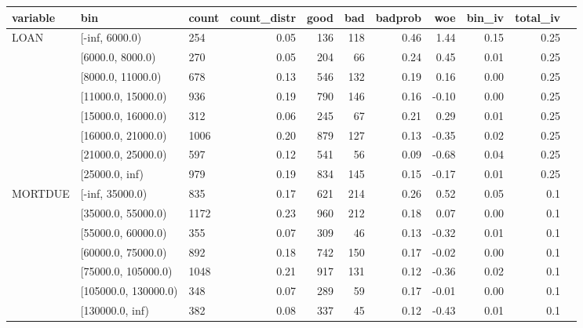 \begin{landscape}
	\begin{figure}[!ht]
		\centering
		\begin{tabular}{lllrrrrrrrr}
			\toprule
			variable & bin &  count &  count\_distr &  good &  bad &   badprob &       woe &    bin\_iv &  total\_iv \\
			\midrule
			    LOAN &      [-inf, 6000.0) &    254 &         0.05 &   136 &  118 &     0.46 &  1.44 &    0.15 &      0.25 \\
			     &    [6000.0, 8000.0) &    270 &         0.05 &   204 &   66 &     0.24 &  0.45 &    0.01 &      0.25 \\
			     &   [8000.0, 11000.0) &    678 &         0.13 &   546 &  132 &     0.19 &  0.16 &    0.00 &      0.25 \\
			     &  [11000.0, 15000.0) &    936 &         0.19 &   790 &  146 &     0.16 & -0.10 &    0.00 &      0.25 \\
			     &  [15000.0, 16000.0) &    312 &         0.06 &   245 &   67 &     0.21 &  0.29 &    0.01 &      0.25 \\
			     &  [16000.0, 21000.0) &   1006 &         0.20 &   879 &  127 &     0.13 & -0.35 &    0.02 &      0.25 \\
			     &  [21000.0, 25000.0) &    597 &         0.12 &   541 &   56 &     0.09 & -0.68 &    0.04 &      0.25 \\
			     &      [25000.0, inf) &    979 &         0.19 &   834 &  145 &     0.15 & -0.17 &    0.01 &      0.25 \\
			\midrule
			  MORTDUE &       [-inf, 35000.0) &    835 &         0.17 &   621 &  214 &     0.26 &  0.52 &    0.05 &       0.1 \\
			  &    [35000.0, 55000.0) &   1172 &         0.23 &   960 &  212 &     0.18 &  0.07 &    0.00 &       0.1 \\
			  &    [55000.0, 60000.0) &    355 &         0.07 &   309 &   46 &     0.13 & -0.32 &    0.01 &       0.1 \\
			  &    [60000.0, 75000.0) &    892 &         0.18 &   742 &  150 &     0.17 & -0.02 &    0.00 &       0.1 \\
			  &   [75000.0, 105000.0) &   1048 &         0.21 &   917 &  131 &     0.12 & -0.36 &    0.02 &       0.1 \\
			  &  [105000.0, 130000.0) &    348 &         0.07 &   289 &   59 &     0.17 & -0.01 &    0.00 &       0.1 \\
			  &       [130000.0, inf) &    382 &         0.08 &   337 &   45 &     0.12 & -0.43 &    0.01 &       0.1 \\

\end{tabular}
\end{figure}
\end{landscape}
